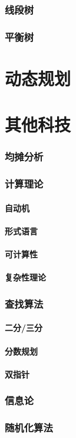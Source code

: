\documentclass[12pt,a4paper]{article}
\begin{document}
\section{线段树}
\section{平衡树}

\newpage
\part{动态规划}


\newpage
\part{其他科技}
\section{均摊分析}
\section{计算理论}  %
\subsection{自动机}
\subsection{形式语言}
\subsection{可计算性}
\subsection{复杂性理论}
\section{查找算法}
\subsection{二分/三分}
\subsection{分数规划}
\subsection{双指针}
\section{信息论}
\section{随机化算法}
\end{document}
